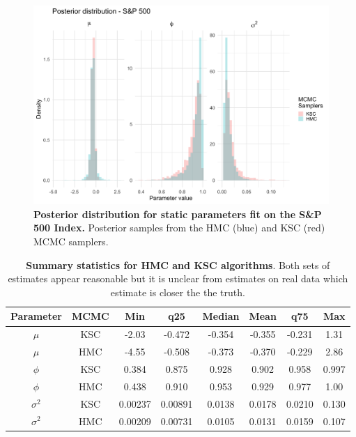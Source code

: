 \documentclass[12pt, a4paper]{article}
\begin{document}

    \begin{figure}[H]
        \centering
        \includegraphics[scale=0.1]{motivating_example/real_data_ex.png}
        \caption{\textbf{Posterior distribution for static parameters fit on the S\&P 500 Index.} Posterior samples from the HMC (blue) and KSC (red) MCMC samplers.}
        \label{fig:realdataex}
    \end{figure}

    \begin{table}[H]
        \centering
        \begin{tabular}{|c|c|c|c|c|c|c|c|} \hline 
        Parameter&  MCMC&Min& q25&  Median& Mean & q75&Max\\ \hline 
        $\mu$&  KSC&-2.03 & -0.472 & -0.354 & -0.355 & -0.231 & 1.31 \\
     $\mu$&  HMC&-4.55 & -0.508 & -0.373 & -0.370 & -0.229 &2.86  \\\hline 
     $\phi$&  KSC&0.384 & 0.875 & 0.928 & 0.902 & 0.958 & 0.997 \\
     $\phi$&  HMC&0.438 & 0.910 & 0.953 & 0.929 & 0.977 &1.00  \\ \hline 
     $\sigma^2$&  KSC&0.00237 & 0.00891 & 0.0138 & 0.0178 & 0.0210 & 0.130 \\ 
     $\sigma^2$&  HMC&0.00209 & 0.00731 & 0.0105 & 0.0131 & 0.0159 &0.107 \\ \hline
        \end{tabular}
        \caption{\textbf{Summary statistics for HMC and KSC algorithms}. Both sets of estimates appear reasonable but it is unclear from estimates on real data which estimate is closer the the truth.}
        \label{tab:realdata}
    \end{table}
    
\end{document}
